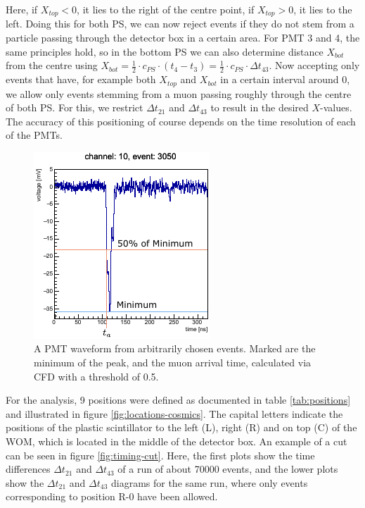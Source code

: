 	Here, if $X_{top} < 0$, it lies to the right of the centre point, if $X_{top} > 0$, it lies to the left.
	Doing this for both \ac{PS}, we can now reject events if they do not stem from a particle passing through the detector box in a certain area.
	For \ac{PMT} 3 and 4, the same principles hold, so in the bottom \ac{PS} we can also determine distance $X_{bot}$ from the centre using $X_{bot} =  \frac{1}{2} \cdot c_{PS} \cdot (t_4 - t_3) = \frac{1}{2} \cdot c_{PS} \cdot \Delta t_{43}$.
	Now accepting only events that have, for example both $X_{top}$ and $X_{bot}$ in a certain interval around 0, we allow only events stemming from a muon passing roughly through the centre of both \ac{PS}. For this, we restrict $\Delta t_{21}$ and $\Delta t_{43}$ to result in the desired $X$-values. 
	The accuracy of this positioning of course depends on the time resolution of each of the \ac{PMT}s.
	
	\begin{figure}[h]
		\centering
		\includegraphics[width=.4\textwidth]{pictures/cfd.pdf}
		\caption{A \ac{PMT} waveform from arbitrarily chosen events. Marked are the minimum of the peak, and the muon arrival time, calculated via \ac{CFD} with a threshold of \num{0.5}.}
		\label{fig:CFD}
	\end{figure}

	For the analysis, 9 positions were defined as documented in table \ref{tab:positions} and illustrated in figure \ref{fig:locations-cosmics}. The capital letters indicate the positions of the plastic scintillator to the left (L), right (R) and on top (C) of the \ac{WOM}, which is located in the middle of the detector box. An example of a cut can be seen in figure \ref{fig:timing-cut}. Here, the first plots show the time differences $\Delta t_{21}$ and $\Delta t_{43}$ of a run of about \num{70000} events, and the lower plots show the $\Delta t_{21}$ and $\Delta t_{43}$ diagrams for the same run, where only events corresponding to position R-0 have been allowed. 
	
